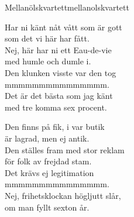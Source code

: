 \begin{song}{Mellanölskvartett}{mellanolskvartett}
\begin{vers}
Har ni känt nåt vått som är gott\\
som det vi här har fått.\\
Nej, här har ni ett Eau-de-vie\\
med humle och dumle i.\\
Den klunken visste var den tog\\
mmmmmmmmmmmmmmm.\\
Det är det bästa som jag känt\\
med tre komma sex procent.\\
\end{vers}
\begin{vers}
Den finns på fik, i var butik\\
är lagrad, men ej antik.\\
Den ställes fram med stor reklam\\
för folk av frejdad stam.\\
Det krävs ej legitimation\\
mmmmmmmmmmmmmmm.\\
Nej, frihetsklockan högljutt slår,\\
om man fyllt sexton år.\\
\end{vers}
\end{song}
